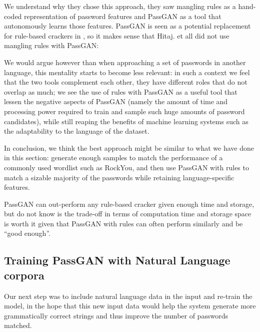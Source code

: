 We understand why they chose this approach, they saw mangling rules as a hand-coded representation of password features and PassGAN as a tool that autonomously learns those features.
PassGAN is seen as a potential replacement for rule-based crackers in \cite{PassGAN}, so it makes sense that Hitaj. et all did not use mangling rules with PassGAN:

We would argue however than when approaching a set of passwords in another language, this mentality starts to become less relevant: in such a context we feel that the two tools complement each other, they have different roles that do not overlap as much; we see the use of rules with PassGAN as a useful tool that lessen the negative aspects of PassGAN (namely the amount of time and processing power required to train and sample such huge amounts of password candidates), while still reaping the benefits of machine learning systems such as the adaptability to the language of the dataset.

In conclusion, we think the best approach might be similar to what we have done in this section: generate enough samples to match the performance of a commonly used wordlist such as RockYou, and then use PassGAN with rules to match a sizable majority of the passwords while retaining language-specific features.

PassGAN can out-perform any rule-based cracker given enough time and storage, but do not know is the trade-off in terms of computation time and storage space is worth it given that PassGAN with rules can often perform similarly and be \enquote{good enough}. 


\subsection{Training PassGAN with Natural Language corpora} \label{subsec:nl-testing}
Our next step was to include natural language data in the input and re-train the model, in the hope that this new input data would help the system generate more grammatically correct strings and thus improve the number of passwords matched.

